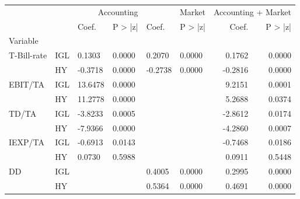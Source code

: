 \begin{tabular}{llllllrr}
\toprule
 &  & \multicolumn{2}{r}{Accounting} & \multicolumn{2}{r}{Market} & \multicolumn{2}{r}{Accounting + Market} \\
 &  & Coef. & P > |z| & Coef. & P > |z| & Coef. & P > |z| \\
Variable &  &  &  &  &  &  &  \\
\midrule
\multirow[t]{2}{*}{T-Bill-rate} & IGL & 0.1303 & 0.0000 & 0.2070 & 0.0000 & 0.1762 & 0.0000 \\
 & HY & -0.3718 & 0.0000 & -0.2738 & 0.0000 & -0.2816 & 0.0000 \\
\cline{1-8}
\multirow[t]{2}{*}{EBIT/TA} & IGL & 13.6478 & 0.0000 &  &  & 9.2151 & 0.0001 \\
 & HY & 11.2778 & 0.0000 &  &  & 5.2688 & 0.0374 \\
\cline{1-8}
\multirow[t]{2}{*}{TD/TA} & IGL & -3.8233 & 0.0005 &  &  & -2.8612 & 0.0174 \\
 & HY & -7.9366 & 0.0000 &  &  & -4.2860 & 0.0007 \\
\cline{1-8}
\multirow[t]{2}{*}{IEXP/TA} & IGL & -0.6913 & 0.0143 &  &  & -0.7468 & 0.0186 \\
 & HY & 0.0730 & 0.5988 &  &  & 0.0911 & 0.5448 \\
\cline{1-8}
\multirow[t]{2}{*}{DD} & IGL &  &  & 0.4005 & 0.0000 & 0.2995 & 0.0000 \\
 & HY &  &  & 0.5364 & 0.0000 & 0.4691 & 0.0000 \\
\cline{1-8}
\bottomrule
\end{tabular}
